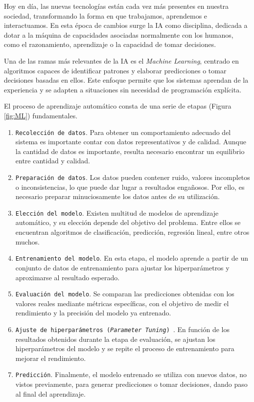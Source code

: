 Hoy en día, las nuevas tecnologías están cada vez más presentes en nuestra sociedad, transformando la forma en que trabajamos, aprendemos e interactuamos.
En esta época de cambios surge la IA como disciplina, dedicada a dotar a la máquina de capacidades asociadas normalmente con los humanos, como el razonamiento, aprendizaje o la capacidad de tomar decisiones.

\vspace{0.5cm}

Una de las ramas más relevantes de la IA es el \textit{Machine Learning}, centrado en algoritmos capaces de identificar patrones y elaborar predicciones o tomar decisiones basadas en ellos. Este enfoque permite que los sistemas aprendan de la experiencia y se adapten a situaciones sin necesidad de programación explícita.

\vspace{0.5cm}

El proceso de aprendizaje automático consta de una serie de etapas (Figura \ref{fig:ML}) fundamentales.

\begin{enumerate}
	\item \texttt{Recolección de datos}. Para obtener un comportamiento adecuado del sistema es importante contar con datos representativos y de calidad. Aunque la cantidad de datos es importante, resulta necesario encontrar un equilibrio entre cantidad y calidad.
	\item \texttt{Preparación de datos}. Los datos pueden contener ruido, valores incompletos o inconsistencias, lo que puede dar lugar a resultados engañosos. Por ello, es necesario preparar minuciosamente los datos antes de su utilización.
	\item \texttt{Elección del modelo}. Existen multitud de modelos de aprendizaje automático, y su elección depende del objetivo del problema. Entre ellos se encuentran algoritmos de clasificación, predicción, regresión lineal, entre otros muchos.
	\item \texttt{Entrenamiento del modelo}. En esta etapa, el modelo aprende a partir de un conjunto de datos de entrenamiento para ajustar los hiperparámetros y aproximarse al resultado esperado.
	\item \texttt{Evaluación del modelo}. Se comparan las predicciones obtenidas con los valores reales mediante métricas específicas, con el objetivo de medir el rendimiento y la precisión del modelo ya entrenado.
	\item \texttt{Ajuste de hiperparámetros (\textit{Parameter Tuning}) }. En función de los resultados obtenidos durante la etapa de evaluación, se ajustan los hiperparámetros del modelo y se repite el proceso de entrenamiento para mejorar el rendimiento.
	\item \texttt{Predicción}. Finalmente, el modelo entrenado se utiliza con nuevos datos, no vistos previamente, para generar predicciones o tomar decisiones, dando paso al final del aprendizaje.
\end{enumerate}

